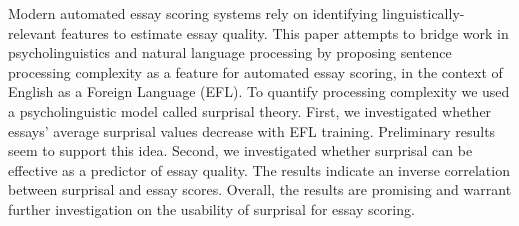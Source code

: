 Modern automated essay scoring systems rely on identifying linguistically-relevant features to estimate essay quality. This paper attempts to bridge work in psycholinguistics and natural language processing by proposing sentence processing complexity as a feature for automated essay scoring, in the context of English as a Foreign Language (EFL). To quantify processing complexity we used a psycholinguistic model called surprisal theory. First, we investigated whether essays' average surprisal values decrease with EFL training. Preliminary results seem to support this idea. Second, we investigated whether surprisal can be effective as a predictor of essay quality. The results indicate an inverse correlation between surprisal and essay scores. Overall, the results are promising and warrant further investigation on the usability of surprisal for essay scoring.
